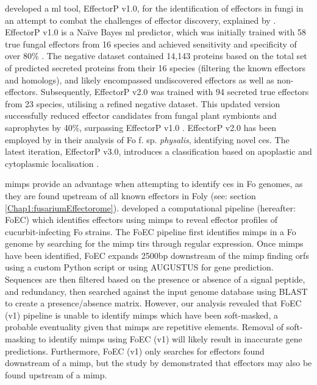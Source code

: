 \textcite{Sperschneider2016} developed a \ac{ml} tool, EffectorP v1.0, for the identification of effectors in fungi in an attempt to combat the challenges of effector discovery, explained by \textcite{Sperschneider2015, LoPresti2015}. EffectorP v1.0 is a Naïve Bayes \ac{ml} predictor, which was initially trained with 58 true fungal effectors from 16 species and achieved sensitivity and specificity of over 80\% \parencite{Sperschneider2016}. The negative dataset contained 14,143 proteins based on the total set of predicted secreted proteins from their 16 species (filtering the known effectors and homologs), and likely encompassed undiscovered effectors as well as non-effectors. Subsequently, EffectorP v2.0 was trained with 94 secreted true effectors from 23 species, utilising a refined negative dataset. This updated version successfully reduced effector candidates from fungal plant symbionts and saprophytes by 40\%, surpassing EffectorP v1.0 \parencite{Sperschneider2018}. EffectorP v2.0 has been employed by \textcite{Simbaqueba2020} in their analysis of \ac{Fo} f. sp. \textit{physalis}, identifying novel \acp{ce}. The latest iteration, EffectorP v3.0, introduces a classification based on apoplastic and cytoplasmic localisation \parencite{Sperschneider2022}. 

\Acp{mimp} provide an advantage when attempting to identify \acp{ce} in \ac{Fo} genomes, as they are found upstream of all known effectors in \ac{Foly} \parencite{Schmidt2013} (see: section \ref{Chap1:fusariumEffectorome}). \textcite{Dam2016} developed a computational pipeline (hereafter: FoEC) which identifies effectors using \acp{mimp} to reveal effector profiles of cucurbit-infecting \ac{Fo} strains. The FoEC pipeline first identifies \acp{mimp} in a \ac{Fo} genome by searching for the \ac{mimp} \acp{tir} through regular expression. Once \acp{mimp} have been identified, FoEC expands 2500bp downstream of the \ac{mimp} finding \acp{orf} using a custom Python script or using AUGUSTUS \parencite{Stanke2006} for gene prediction. Sequences are then filtered based on the presence or absence of a signal peptide, and redundancy, then searched against the input genome database using BLAST to create a presence/absence matrix. However, our analysis revealed that FoEC (v1) pipeline is unable to identify \acp{mimp} which have been soft-masked, a probable eventuality given that \acp{mimp} are repetitive elements. Removal of soft-masking to identify \acp{mimp} using FoEC (v1) will likely result in inaccurate gene predictions. Furthermore, FoEC (v1) only searches for effectors found downstream of a \ac{mimp}, but the study by \textcite{Schmidt2013} demonstrated that effectors may also be found upstream of a \ac{mimp}. 

